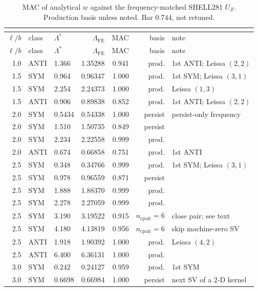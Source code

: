 \begin{longtable}{@{}rllrrrl@{}}
\caption{MAC of analytical $w$ against the frequency-matched SHELL281
$U_Z$. Production basis unless noted. Bar $0.744$, not retuned.}\\
\label{tab:oop-mac}\\
\toprule
$\ell/b$ & class & $\Lambda^{*}$ & $\Lambda_{\mathrm{FE}}$ & MAC & basis & note \\
\midrule
\endfirsthead
\toprule
$\ell/b$ & class & $\Lambda^{*}$ & $\Lambda_{\mathrm{FE}}$ & MAC & basis & note \\
\midrule
\endhead
1.0 & ANTI & 1.366 & 1.35288 & 0.941 & prod. & 1st ANTI; Leissa $(2,2)$ \\
1.5 & SYM  & 0.964 & 0.96347 & 1.000 & prod. & 1st SYM; Leissa $(3,1)$ \\
1.5 & SYM  & 2.254 & 2.24373 & 1.000 & prod. & Leissa $(1,3)$ \\
1.5 & ANTI & 0.906 & 0.89838 & 0.852 & prod. & 1st ANTI; Leissa $(2,2)$ \\
2.0 & SYM  & 0.5434 & 0.54338 & 1.000 & persist & persist-only frequency \\
2.0 & SYM  & 1.510 & 1.50735 & 0.849 & persist & \\
2.0 & SYM  & 2.234 & 2.22558 & 0.999 & prod. & \\
2.0 & ANTI & 0.674 & 0.66858 & 0.751 & prod. & 1st ANTI \\
2.5 & SYM  & 0.348 & 0.34766 & 0.999 & prod. & 1st SYM; Leissa $(3,1)$ \\
2.5 & SYM  & 0.978 & 0.96559 & 0.871 & persist & \\
2.5 & SYM  & 1.888 & 1.88370 & 0.999 & prod. & \\
2.5 & SYM  & 2.278 & 2.27059 & 0.999 & prod. & \\
2.5 & SYM  & 3.190 & 3.19522 & 0.915 & $n_{\mathrm{cpair}}=6$ & close pair; see text \\
2.5 & SYM  & 4.180 & 4.13819 & 0.956 & $n_{\mathrm{cpair}}=6$ & skip machine-zero SV \\
2.5 & ANTI & 1.918 & 1.90392 & 1.000 & prod. & Leissa $(4,2)$ \\
2.5 & ANTI & 6.400 & 6.36131 & 1.000 & prod. & \\
3.0 & SYM  & 0.242 & 0.24127 & 0.959 & prod. & 1st SYM \\
3.0 & SYM  & 0.6698 & 0.66984 & 1.000 & persist & next SV of a 2-D kernel \\

\end{longtable}
